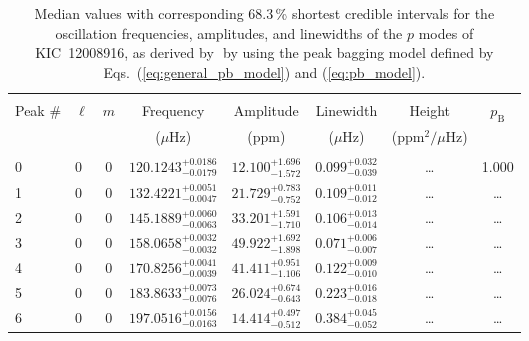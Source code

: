 \begin{table*}[!]
\caption{Median values with corresponding 68.3\,\% shortest credible intervals for the oscillation frequencies, amplitudes, and linewidths of the $p$ modes of KIC~12008916, as derived by \diamonds\,\,by using the peak bagging model defined by Eqs.~(\ref{eq:general_pb_model}) and (\ref{eq:pb_model}).}
\label{tab:12008916p}
\centering
\begin{tabular}{llcrrlrc}
\hline\hline
\\[-8pt]          
Peak \# & $\ell$ & $m$ & \multicolumn{1}{c}{Frequency} & \multicolumn{1}{c}{Amplitude} & \multicolumn{1}{c}{Linewidth} & \multicolumn{1}{c}{Height}& $p_\mathrm{B}$\\
 & & & \multicolumn{1}{c}{($\mu$Hz)} & \multicolumn{1}{c}{(ppm)} & \multicolumn{1}{c}{($\mu$Hz)} & \multicolumn{1}{c}{(ppm$^2/\mu$Hz)}\\
\hline \\[-8pt]
0 & 0 & 0 & $   120.1243_{-      0.0179}^{+      0.0186}$ & $      12.100_{-       1.572}^{+       1.696}$ & $       0.099_{-       0.039}^{+       0.032}$ & \multicolumn{1}{c}{\dots} & 1.000\\[1pt]
1 & 0 & 0 & $   132.4221_{-      0.0047}^{+      0.0051}$ & $      21.729_{-       0.752}^{+       0.783}$ & $       0.109_{-       0.012}^{+       0.011}$ & \multicolumn{1}{c}{\dots} & \dots \\[1pt]
2 & 0 & 0 & $    145.1889_{-      0.0063}^{+      0.0060}$ & $      33.201_{-       1.710}^{+       1.591}$ & $       0.106_{-       0.014}^{+       0.013}$ & \multicolumn{1}{c}{\dots} & \dots \\[1pt]
3 & 0 & 0 & $    158.0658_{-      0.0032}^{+      0.0032}$ & $      49.922_{-       1.898}^{+       1.692}$ & $       0.071_{-       0.007}^{+       0.006}$ & \multicolumn{1}{c}{\dots} & \dots \\[1pt]
4 & 0 & 0 & $    170.8256_{-      0.0039}^{+      0.0041}$ & $      41.411_{-       1.106}^{+       0.951}$ & $       0.122_{-       0.010}^{+       0.009}$ & \multicolumn{1}{c}{\dots} & \dots \\[1pt]
5 & 0 & 0 & $    183.8633_{-      0.0076}^{+      0.0073}$ & $      26.024_{-       0.643}^{+       0.674}$ & $       0.223_{-       0.018}^{+       0.016}$ & \multicolumn{1}{c}{\dots} & \dots \\[1pt]
6 & 0 & 0 & $    197.0516_{-      0.0163}^{+      0.0156}$ & $      14.414_{-       0.512}^{+       0.497}$ & $       0.384_{-       0.052}^{+       0.045}$ & \multicolumn{1}{c}{\dots} & \dots \\[1pt]

\end{tabular}
\end{table*}
